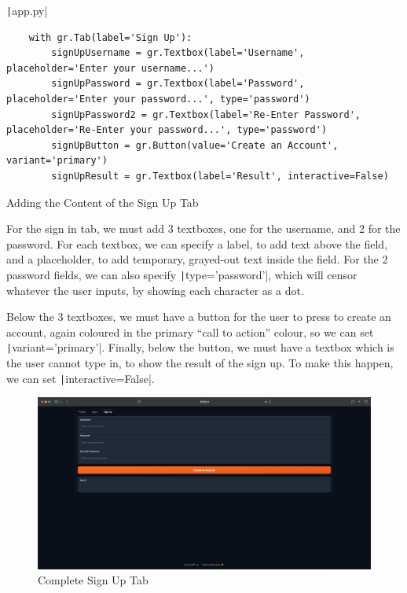 \documentclass[12pt]{report}
\newcommand{\pil}[1]{\protect\texttt|#1|}
\begin{document}
\begin{listing}[H]
\pil{app.py}
\begin{verbatim}
    with gr.Tab(label='Sign Up'):
        signUpUsername = gr.Textbox(label='Username', placeholder='Enter your username...')
        signUpPassword = gr.Textbox(label='Password', placeholder='Enter your password...', type='password')
        signUpPassword2 = gr.Textbox(label='Re-Enter Password', placeholder='Re-Enter your password...', type='password')
        signUpButton = gr.Button(value='Create an Account', variant='primary')
        signUpResult = gr.Textbox(label='Result', interactive=False)
\end{verbatim}
\caption{Adding the Content of the Sign Up Tab}\label{cs:signUpContent}
\end{listing}

For the sign in tab, we must add 3 textboxes, one for the username, and 2 for the password. For each textbox, we can specify a label, to add text above the field, and a placeholder, to add temporary, grayed-out text inside the field. For the 2 password fields, we can also specify \pil{type='password'}, which will censor whatever the user inputs, by showing each character as a dot.

Below the 3 textboxes, we must have a button for the user to press to create an account, again coloured in the primary ``call to action'' colour, so we can set \pil{variant='primary'}. Finally, below the button, we must have a textbox which is the user cannot type in, to show the result of the sign up. To make this happen, we can set \pil{interactive=False}.

\begin{figure}[H]
\centering
\includegraphics[width=14cm]{ss14.4.png}
\caption{Complete Sign Up Tab}\label{fig:ss14.4}
\end{figure}
\end{document}
